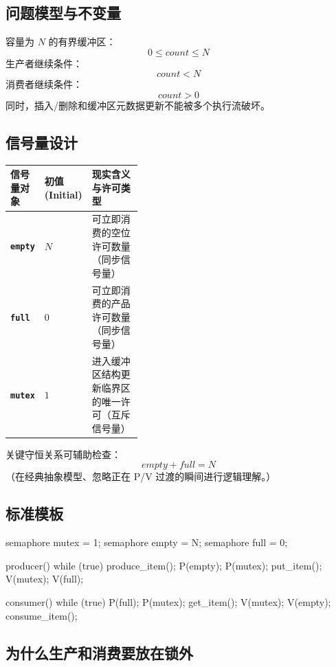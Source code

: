 \documentclass[11pt,a4paper]{ctexart}
\newcommand{\code}[1]{\texttt{#1}}
\begin{document}
\subsection{问题模型与不变量}

容量为 $N$ 的有界缓冲区：
\[
0\le count\le N
\]
生产者继续条件：
\[
count<N
\]
消费者继续条件：
\[
count>0
\]
同时，插入/删除和缓冲区元数据更新不能被多个执行流破坏。

\subsection{信号量设计}

\begingroup
\small
\renewcommand{\arraystretch}{1.25}
\setlength{\tabcolsep}{6pt}
\begin{tabularx}{\linewidth}{>{\bfseries}p{0.2\linewidth} p{0.18\linewidth} X}
\toprule
信号量对象 & 初值 (Initial) & 现实含义与许可类型\\
\midrule
\code{empty} & $N$ & 可立即消费的空位许可数量（同步信号量）\\
\code{full} & $0$ & 可立即消费的产品许可数量（同步信号量）\\
\code{mutex} & $1$ & 进入缓冲区结构更新临界区的唯一许可（互斥信号量）\\
\bottomrule
\end{tabularx}
\endgroup

关键守恒关系可辅助检查：
\[
empty+full=N
\]
（在经典抽象模型、忽略正在 P/V 过渡的瞬间进行逻辑理解。）

\subsection{标准模板}

\begin{codeblock}
semaphore mutex = 1;
semaphore empty = N;
semaphore full  = 0;

producer() {
    while (true) {
        produce_item();
        P(empty);
        P(mutex);
        put_item();
        V(mutex);
        V(full);
    }
}

consumer() {
    while (true) {
        P(full);
        P(mutex);
        get_item();
        V(mutex);
        V(empty);
        consume_item();
    }
}
\end{codeblock}

\subsection{为什么生产和消费要放在锁外}
\end{document}

